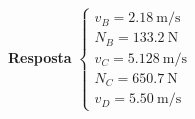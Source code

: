 
\textbf{Resposta}
$
\begin{cases}
	v_{B}=\SI{2.18}{\meter/\second}\\
	N_{B}=\SI{133.2}{\newton}\\
	v_{C}=\SI{5.128}{\meter/\second}\\
	N_{C}=\SI{650.7}{\newton}\\
	v_{D}=\SI{5.50}{\meter/\second}
\end{cases}
$
